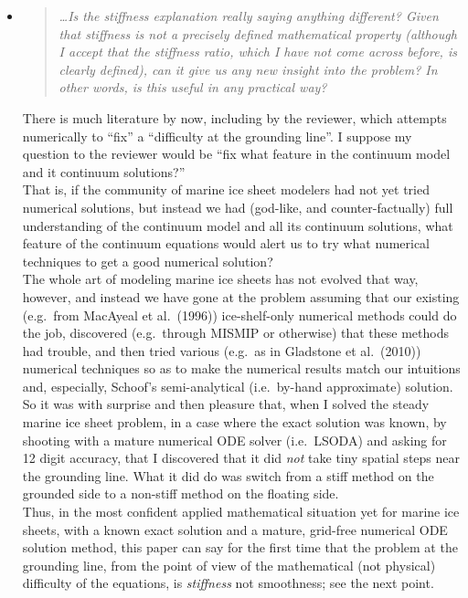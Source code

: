 \documentclass[11pt,reqno]{amsart}
\newcommand{\reply}[2]{
\medskip\medskip
\item  \begin{quote}
\emph{#1}
\end{quote}

\medskip
\noindent #2}
\begin{document}
\begin{itemize}
\reply{\dots Is the stiffness explanation really saying anything different? Given that stiffness is not a precisely defined mathematical property (although I accept that the stiffness ratio, which I have not come across before, is clearly defined), can it give us any new insight into the problem? In other words, is this useful in any practical way?}
{There is much literature by now, including by the reviewer, which attempts numerically to ``fix'' a ``difficulty at the grounding line''.  I suppose my question to the reviewer would be ``fix what feature in the continuum model and it continuum solutions?''  \medskip \\
That is, if the community of marine ice sheet modelers had not yet tried numerical solutions, but instead we had (god-like, and counter-factually) full understanding of the continuum model and all its continuum solutions, what feature of the continuum equations would alert us to try what numerical techniques to get a good numerical solution? \medskip \\
The whole art of modeling marine ice sheets has not evolved that way, however, and instead we have gone at the problem assuming that our existing (e.g.~from MacAyeal et al.~(1996)) ice-shelf-only numerical methods could do the job, discovered (e.g.~through MISMIP or otherwise) that these methods had trouble, and then tried various (e.g.~as in Gladstone et al.~(2010)) numerical techniques so as to make the numerical results match our intuitions and, especially, Schoof's semi-analytical (i.e.~by-hand approximate) solution. \medskip \\
So it was with surprise and then pleasure that, when I solved the steady marine ice sheet problem, in a case where the exact solution was known, by shooting with a mature numerical ODE solver (i.e.~LSODA) and asking for 12 digit accuracy, that I discovered that it did \emph{not} take tiny spatial steps near the grounding line.  What it did do was switch from a stiff method on the grounded side to a non-stiff method on the floating side. \medskip \\
Thus, in the most confident applied mathematical situation yet for marine ice sheets, with a known exact solution and a mature, grid-free numerical ODE solution method, this paper can say for the first time that the problem at the grounding line, from the point of view of the mathematical (not physical) difficulty of the equations, is \emph{stiffness} not smoothness; see the next point.}


\end{itemize}
\end{document}
